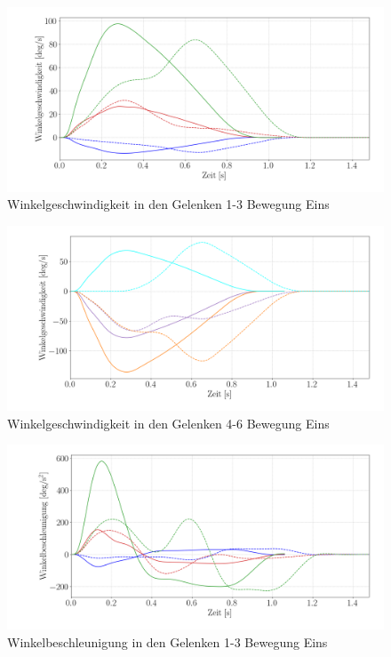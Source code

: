 \begin{figure}[tbph]
	\centering
	\includegraphics[width=1\linewidth]{images/velposdown1}
	\caption{Winkelgeschwindigkeit in den Gelenken 1-3 Bewegung Eins}
	\label{fig:velposdown1}
\end{figure}
\begin{figure}[tbph]
	\centering
	\includegraphics[width=1\linewidth]{images/velposdown2}
	\caption{Winkelgeschwindigkeit in den Gelenken 4-6 Bewegung Eins}
	\label{fig:velposdown2}
\end{figure}
\begin{figure}[tbph]
	\centering
	\includegraphics[width=1\linewidth]{images/accdown1}
	\caption{Winkelbeschleunigung in den Gelenken 1-3 Bewegung Eins}
	\label{fig:accdown1}
\end{figure}
